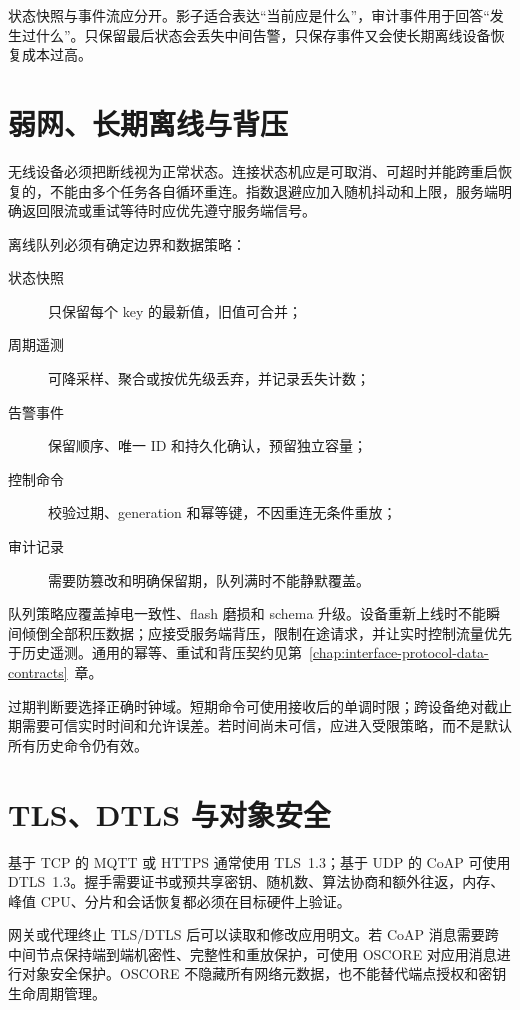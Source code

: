 状态快照与事件流应分开。影子适合表达“当前应是什么”，审计事件用于回答“发生过什么”。只保留最后状态会丢失中间告警，只保存事件又会使长期离线设备恢复成本过高。

\section{弱网、长期离线与背压}

无线设备必须把断线视为正常状态。连接状态机应是可取消、可超时并能跨重启恢复的，不能由多个任务各自循环重连。指数退避应加入随机抖动和上限，服务端明确返回限流或重试等待时应优先遵守服务端信号。

离线队列必须有确定边界和数据策略：

\begin{description}
  \item[状态快照] 只保留每个 key 的最新值，旧值可合并；
  \item[周期遥测] 可降采样、聚合或按优先级丢弃，并记录丢失计数；
  \item[告警事件] 保留顺序、唯一 ID 和持久化确认，预留独立容量；
  \item[控制命令] 校验过期、generation 和幂等键，不因重连无条件重放；
  \item[审计记录] 需要防篡改和明确保留期，队列满时不能静默覆盖。
\end{description}

队列策略应覆盖掉电一致性、flash 磨损和 schema 升级。设备重新上线时不能瞬间倾倒全部积压数据；应接受服务端背压，限制在途请求，并让实时控制流量优先于历史遥测。通用的幂等、重试和背压契约见\mbox{第~\ref{chap:interface-protocol-data-contracts}~章}。

过期判断要选择正确时钟域。短期命令可使用接收后的单调时限；跨设备绝对截止期需要可信实时时间和允许误差。若时间尚未可信，应进入受限策略，而不是默认所有历史命令仍有效。

\section{TLS、DTLS 与对象安全}

基于 TCP 的 MQTT 或 HTTPS 通常使用 TLS~1.3\cite{rfc8446}；基于 UDP 的 CoAP 可使用 DTLS~1.3\cite{rfc9147}。握手需要证书或预共享密钥、随机数、算法协商和额外往返，内存、峰值 CPU、分片和会话恢复都必须在目标硬件上验证。

网关或代理终止 TLS/DTLS 后可以读取和修改应用明文。若 CoAP 消息需要跨中间节点保持端到端机密性、完整性和重放保护，可使用 OSCORE 对应用消息进行对象安全保护\cite{rfc8613}。OSCORE 不隐藏所有网络元数据，也不能替代端点授权和密钥生命周期管理。

